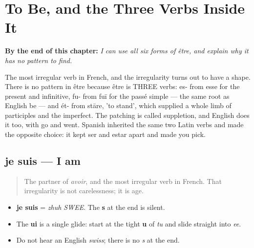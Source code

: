 
\chapter{To Be, and the Three Verbs Inside It}
\label{ch:etre}

\begin{chapteropening}
\textbf{By the end of this chapter:} \emph{I can use all six forms of être, and explain why it has no pattern to find.}

The most irregular verb in French, and the irregularity turns out to have a shape. There is no pattern in être because être is THREE verbs: es- from esse for the present and infinitive, fu- from fuī for the passé simple — the same root as English be — and ét- from stāre, 'to stand', which supplied a whole limb of participles and the imperfect. The patching is called suppletion, and English does it too, with go and went. Spanish inherited the same two Latin verbs and made the opposite choice: it kept ser and estar apart and made you pick.
\end{chapteropening}

\section[je suis]{je suis — I am}

\label{lesson:FR-C16-suis}



\begin{quote}
The partner of \emph{avoir}, and the most irregular verb in French. That irregularity is not carelessness; it is age.
\end{quote}

\begin{sounds}
\begin{itemize}
\raggedright
  \item \textbf{je suis} = \emph{zhuh SWEE}. The \textbf{s} at the end is silent.
  \item The \textbf{ui} is a single glide: start at the tight \textbf{u} of \emph{tu} and slide straight into \emph{ee}.
  \item Do not hear an English \emph{swiss}; there is no \emph{s} at the end.
\end{itemize}
\end{sounds}


